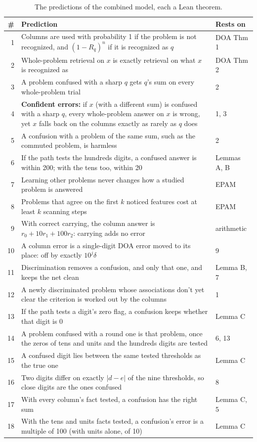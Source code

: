 \documentclass[11pt]{article}
\begin{document}
\begin{table}[t]
\centering
\small
\begin{tabularx}{\linewidth}{@{}rXl@{}}
\toprule
\# & Prediction & Rests on \\
\midrule
1 & Columns are used with probability 1 if the problem is not recognized, and $(1-R_q)^n$ if it is recognized as $q$ & DOA Thm 1 \\
2 & Whole-problem retrieval on $x$ is exactly retrieval on what $x$ is recognized as & DOA Thm 2 \\
3 & A problem confused with a sharp $q$ gets $q$'s sum on every whole-problem trial & 2 \\
4 & \textbf{Confident errors:} if $x$ (with a different sum) is confused with a sharp $q$, every whole-problem answer on $x$ is wrong, yet $x$ falls back on the columns exactly as rarely as $q$ does & 1, 3 \\
5 & A confusion with a problem of the same sum, such as the commuted problem, is harmless & 2 \\
6 & If the path tests the hundreds digits, a confused answer is within 200; with the tens too, within 20 & Lemmas A, B \\
7 & Learning other problems never changes how a studied problem is answered & EPAM \\
8 & Problems that agree on the first $k$ noticed features cost at least $k$ scanning steps & EPAM \\
9 & With correct carrying, the column answer is $r_0 + 10r_1 + 100r_2$: carrying adds no error & arithmetic \\
10 & A column error is a single-digit DOA error moved to its place: off by exactly $10^j\delta$ & 9 \\
11 & Discrimination removes a confusion, and only that one, and keeps the net clean & Lemma B, 7 \\
12 & A newly discriminated problem whose associations don't yet clear the criterion is worked out by the columns & 1 \\
13 & If the path tests a digit's zero flag, a confusion keeps whether that digit is 0 & Lemma C \\
14 & A problem confused with a round one is that problem, once the zeros of tens and units and the hundreds digits are tested & 6, 13 \\
15 & A confused digit lies between the same tested thresholds as the true one & Lemma C \\
16 & Two digits differ on exactly $|d-e|$ of the nine thresholds, so close digits are the ones confused & 8 \\
17 & With every column's fact tested, a confusion has the right sum & Lemma C, 5 \\
18 & With the tens and units facts tested, a confusion's error is a multiple of 100 (with units alone, of 10) & Lemma C \\
\bottomrule
\end{tabularx}
\caption{The predictions of the combined model, each a Lean theorem.}
\label{tab:predictions}
\end{table}
\end{document}

